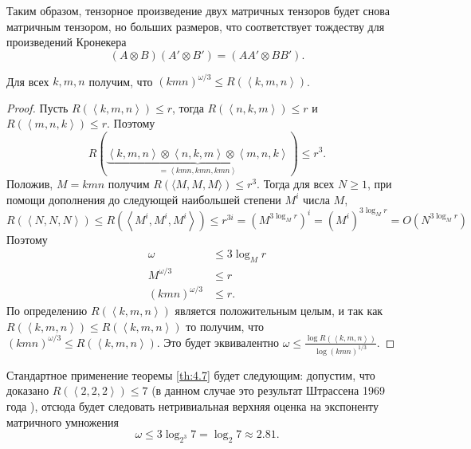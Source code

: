 Таким образом, тензорное произведение двух матричных тензоров будет снова матричным тензором, но больших размеров, что соответствует тождеству для произведений Кронекера
\[
	(A \otimes B)(A' \otimes B') = (AA' \otimes BB').
\]

\begin{theorem}\label{th:4.7}
	Для всех $k,m,n$ получим, что $(kmn)^{\omega/3} \leq R(\left\langle k,m,n \right\rangle)$.
\end{theorem}
\begin{proof}
	Пусть $R(\left\langle k,m,n \right\rangle) \leq r$, тогда $R(\left\langle n,k,m \right\rangle) \leq r$ и $R(\left\langle m,n,k \right\rangle) \leq r$. Поэтому
	\[
		R(\underbrace{\left\langle k,m,n \right\rangle \otimes \left\langle n,k,m \right\rangle \otimes \left\langle m,n,k \right\rangle}_{=\left\langle kmn, kmn, kmn \right\rangle}) \leq r^3.
	\]
	Положив, $M=kmn$ получим $R(\langle M , M, M \rangle) \leq r^3$. Тогда для всех $N \geq 1$, при помощи дополнения до
следующей наибольшей степени $M^i$ числа $M$,
	\[
		R(\left\langle N,N,N \right\rangle) \leq R(\left\langle M^i, M^i, M^i \right\rangle) \leq r^{3i} = (M^{3 \log_M r})^i = (M^i)^{3 \log_M r} = O(N^{3 \log_M r})
	\]
	 Поэтому 
	  \begin{align*}
	    \omega & \leq 3 \log_M r   \\
	    M^{\omega/3} & \leq r \\
	    (k m n)^{\omega/3} & \leq r.
	  \end{align*} 
	По определению $R(\left\langle k,m,n \right\rangle)$ является положительным целым, и так как $R(\left\langle k,m,n \right\rangle) \leq R(\left\langle k,m,n \right\rangle)$ то получим, что $(k m n)^{\omega/3} \leq R(\left\langle k,m,n \right\rangle)$. Это будет эквивалентно $\omega \leq \frac{\log R(\left\langle k,m,n \right\rangle)}{\log (kmn)^{1/3}}$.
\end{proof}

Стандартное применение теоремы \ref{th:4.7} будет следующим: допустим, что доказано $R(\left\langle 2,2,2 \right\rangle) \leq 7$ (в данном случае это результат Штрассена 1969 года \cite{Strassen:1969}), отсюда будет следовать нетривиальная верхняя оценка на экспоненту матричного умножения 
\[
	\omega \leq 3 \log_{2^3} 7 = \log_2 7 \approx 2.81.
\]










